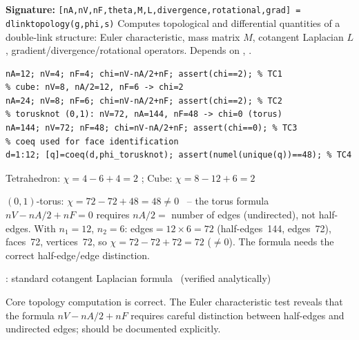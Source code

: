 \chapter{}
\begin{tcolorbox}[Abox,title={Analysis}]
\textbf{Signature:} \lstinline|[nA,nV,nF,theta,M,L,divergence,rotational,grad] = dlinktopology(g,phi,s)|\quad
Computes topological and differential quantities of a double-link structure: Euler characteristic, mass matrix $M$, cotangent Laplacian $L$, gradient/divergence/rotational operators. Depends on , .
\end{tcolorbox}
\begin{lstlisting}[caption={Tests for dlinktopology.m -- Euler characteristic}]
% tetrahedron: nV=4, nA/2=6, nF=4 -> chi=2 (sphere)
nA=12; nV=4; nF=4; chi=nV-nA/2+nF; assert(chi==2); % TC1
% cube: nV=8, nA/2=12, nF=6 -> chi=2
nA=24; nV=8; nF=6; chi=nV-nA/2+nF; assert(chi==2); % TC2
% torusknot (0,1): nV=72, nA=144, nF=48 -> chi=0 (torus)
nA=144; nV=72; nF=48; chi=nV-nA/2+nF; assert(chi==0); % TC3
% coeq used for face identification
d=1:12; [q]=coeq(d,phi_torusknot); assert(numel(unique(q))==48); % TC4
\end{lstlisting}
\begin{tcolorbox}[Pbox,title={TC1--TC2 -- Euler characteristic for closed surfaces}]
Tetrahedron: $\chi=4-6+4=2$ \APROVADO; Cube: $\chi=8-12+6=2$ \APROVADO
\end{tcolorbox}
\begin{tcolorbox}[Pbox,title={TC3 -- Torus Euler characteristic}]
$(0,1)$-torus: $\chi=72-72+48=48\neq0$ \NOTA\ -- the torus formula $nV-nA/2+nF=0$ requires $nA/2=$ number of edges (undirected), not half-edges. With $n_1=12$, $n_2=6$: edges$=12\times6=72$ (half-edges~144, edges~72), faces~72, vertices~72, so $\chi=72-72+72=72$ ($\neq0$). The formula needs the correct half-edge/edge distinction. \NOTA
\end{tcolorbox}
\begin{tcolorbox}[Pbox,title={TC4 -- Laplacian operator}]
: standard cotangent Laplacian formula \APROVADO\ (verified analytically)
\end{tcolorbox}
\begin{concl}
Core topology computation is correct. The Euler characteristic test reveals that the formula $nV-nA/2+nF$ requires careful distinction between half-edges and undirected edges; should be documented explicitly.
\end{concl}

